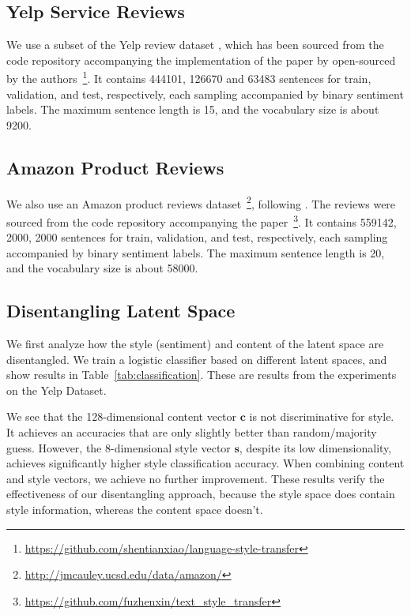 \documentclass[11pt,a4paper]{article}
\begin{document}
\subsection{Yelp Service Reviews}

We use a subset of the Yelp review dataset \citep{challenge2013yelp}, which has been sourced from the code repository accompanying the implementation of the paper by \cite{shen2017style} open-sourced by the authors~\footnote{\url{https://github.com/shentianxiao/language-style-transfer}}. It contains 444101, 126670 and 63483 sentences for train, validation, and test, respectively, each sampling accompanied by binary sentiment labels. The maximum sentence length is 15, and the vocabulary size is about 9200.

\subsection{Amazon Product Reviews}

We also use an Amazon product reviews dataset~\footnote{\url{http://jmcauley.ucsd.edu/data/amazon/}}, following \cite{fu2017style}. The reviews were sourced from the code repository accompanying the paper~\footnote{\url{https://github.com/fuzhenxin/text_style_transfer}}. It contains 559142, 2000, 2000 sentences for train, validation, and test, respectively, each sampling accompanied by binary sentiment labels. The maximum sentence length is 20, and the vocabulary size is about 58000.

\subsection{Disentangling Latent Space}

We first analyze how the style (sentiment) and content of the latent space are disentangled. We train a logistic classifier based on different latent spaces, and show results in Table~\ref{tab:classification}. These are results from the experiments on the Yelp Dataset.

We see that the 128-dimensional content vector $\bm c$ is not discriminative for style. It achieves an accuracies that are only slightly better than random/majority guess. However, the 8-dimensional style vector $\bm s$, despite its low dimensionality, achieves significantly higher style classification accuracy. When combining content and style vectors, we achieve no further improvement. These results verify the effectiveness of our disentangling approach, because the style space does contain style information, whereas the content space doesn't.
\end{document}
